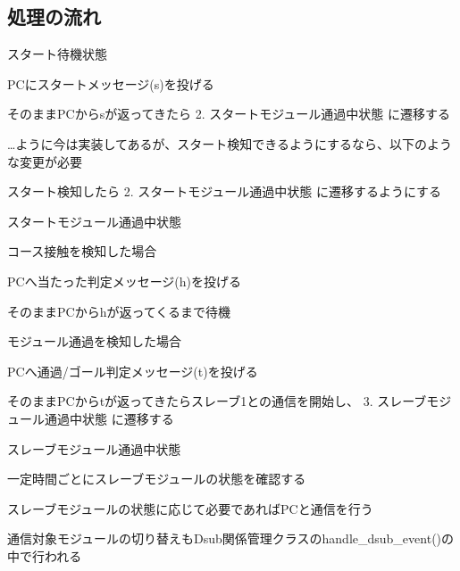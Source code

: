 \subsection*{処理の流れ}


\begin{DoxyEnumerate}
\item スタート待機状態
\end{DoxyEnumerate}
\begin{DoxyItemize}
\item P\+Cにスタートメッセージ(\textquotesingle{}s\textquotesingle{})を投げる
\item そのまま\+P\+Cから\textquotesingle{}s\textquotesingle{}が返ってきたら 2. スタートモジュール通過中状態 に遷移する
\item …ように今は実装してあるが、スタート検知できるようにするなら、以下のような変更が必要
\begin{DoxyItemize}
\item スタート検知したら 2. スタートモジュール通過中状態 に遷移するようにする
\end{DoxyItemize}
\end{DoxyItemize}
\begin{DoxyEnumerate}
\item スタートモジュール通過中状態
\end{DoxyEnumerate}
\begin{DoxyItemize}
\item コース接触を検知した場合
\begin{DoxyItemize}
\item P\+Cへ当たった判定メッセージ(\textquotesingle{}h\textquotesingle{})を投げる
\item そのまま\+P\+Cから\textquotesingle{}h\textquotesingle{}が返ってくるまで待機
\end{DoxyItemize}
\item モジュール通過を検知した場合
\begin{DoxyItemize}
\item P\+Cへ通過/ゴール判定メッセージ(\textquotesingle{}t\textquotesingle{})を投げる
\item そのまま\+P\+Cから\textquotesingle{}t\textquotesingle{}が返ってきたらスレーブ1との通信を開始し、 3. スレーブモジュール通過中状態 に遷移する
\end{DoxyItemize}
\end{DoxyItemize}
\begin{DoxyEnumerate}
\item スレーブモジュール通過中状態
\end{DoxyEnumerate}
\begin{DoxyItemize}
\item 一定時間ごとにスレーブモジュールの状態を確認する
\item スレーブモジュールの状態に応じて必要であれば\+P\+Cと通信を行う
\item 通信対象モジュールの切り替えも\+Dsub関係管理クラスの{\ttfamily handle\+\_\+dsub\+\_\+event()}の中で行われる 
\end{DoxyItemize}